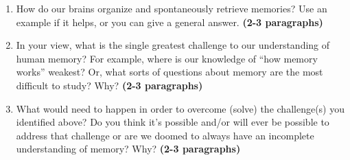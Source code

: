 \documentclass[11pt]{article}
\begin{document}
\begin{enumerate}
\item How do our brains organize and spontaneously retrieve memories?
  Use an example if it helps, or you can give a general answer.
  \textbf{(2-3 paragraphs)}

\item In your view, what is the single greatest challenge to our understanding
  of human memory?  For example, where is our knowledge of ``how
  memory works'' weakest?  Or, what sorts of questions about memory are
  the most difficult to study?  Why?  \textbf{(2-3 paragraphs)}

\item What would need to happen in order to overcome (solve) the challenge(s) you
  identified above?  Do you think it's possible and/or will ever be
  possible to address that challenge or are we doomed to always have
  an incomplete understanding of memory?  Why?  \textbf{(2-3 paragraphs)}
\end{enumerate}
\end{document}
